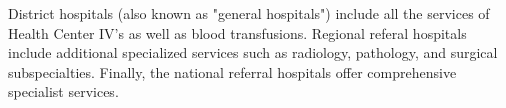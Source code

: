 \documentclass[12pt]{article} %
\begin{document}
District hospitals (also known as "general hospitals") include all the services of Health Center IV's as well as blood transfusions.
Regional referal hospitals include additional specialized services such as radiology, pathology, and surgical subspecialties.
Finally, the national referral hospitals offer comprehensive specialist services. 
\cite{UBS2017}












\end{document}

